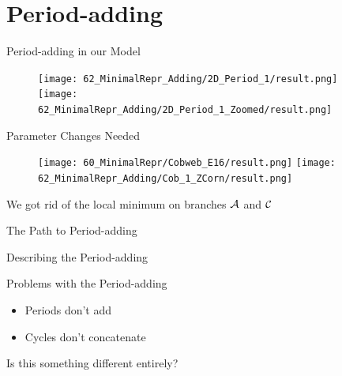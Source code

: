 \section{Period-adding}

\begin{frame}{Period-adding in our Model}
	\begin{figure}
		\texttt{[image: 62\_MinimalRepr\_Adding/2D\_Period\_1/result.png]}
		\quad
		\texttt{[image: 62\_MinimalRepr\_Adding/2D\_Period\_1\_Zoomed/result.png]}
	\end{figure}
\end{frame}

\begin{frame}{Parameter Changes Needed}
	\vspace{-1em}
	\begin{figure}
		\texttt{[image: 60\_MinimalRepr/Cobweb\_E16/result.png]}
		\texttt{[image: 62\_MinimalRepr\_Adding/Cob\_1\_ZCorn/result.png]}
	\end{figure}
	We got rid of the local minimum on branches $\mathcal{A}$ and $\mathcal{C}$
\end{frame}

\begin{frame}{The Path to Period-adding}

\end{frame}

\begin{frame}{Describing the Period-adding}
	\vspace{-1em}
	\begin{figure}
	\end{figure}
\end{frame}

\begin{frame}{Problems with the Period-adding}
	\begin{itemize}
		\item Periods don't add
		\item Cycles don't concatenate
	\end{itemize}
	\pause
	\vspace{3em}
	Is this something different entirely?
\end{frame}
